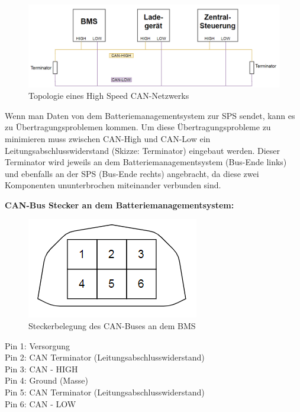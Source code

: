 \begin{figure}[H]
	\begin{center}
		\includegraphics[scale=0.7]{figures/Akku/TopologieCAN-Netzwerks.PNG}
		\caption{Topologie eines High Speed CAN-Netzwerks}
		\label{fig: Topologie eines High Speed CAN-Netzwerks}
	\end{center}
\end{figure}

Wenn man Daten von dem Batteriemanagementsystem zur SPS sendet, kann es zu Übertragungsproblemen kommen. Um diese Übertragungsprobleme zu minimieren muss zwischen CAN-High und CAN-Low ein Leitungsabschlusswiderstand (Skizze: Terminator) eingebaut werden. Dieser Terminator wird jeweils an dem Batteriemanagementsystem (Bus-Ende links) und ebenfalls an der SPS (Bus-Ende rechts) angebracht, da diese zwei Komponenten ununterbrochen miteinander verbunden sind. 

\textbf{CAN-Bus Stecker an dem Batteriemanagementsystem:}

\begin{figure}[H]
	\begin{center}
		\includegraphics[scale=0.7]{figures/Akku/CANStecker.PNG}
		\caption{Steckerbelegung des CAN-Buses an dem BMS}
		\label{fig: Steckerbelegung des CAN-Buses an dem BMS}
	\end{center}
\end{figure}

Pin 1: Versorgung\\
Pin 2: CAN Terminator (Leitungsabschlusswiderstand)\\
Pin 3: CAN - HIGH\\
Pin 4: Ground (Masse)\\
Pin 5: CAN Terminator (Leitungsabschlusswiderstand)\\
Pin 6: CAN - LOW\\
\newpage

